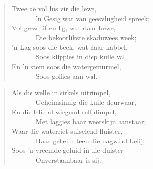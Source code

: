 \begin{verse}
Twee oë vol lus vir die lewe, \\ 
\ \ \ \ \ \ \ ’n Gesig wat van geesvlugheid spreek; \\ 
Vol geesdrif en lig, wat daar bewe, \\ 
\ \ \ \ \ \ \ Die bekoorlikste skaduwees week; \\ 
’n Lag soos die beek, wat daar kabbel, \\ 
\ \ \ \ \ \ \ Soos klippies in diep kuile val, \\ 
En ’n stem soos die watergemurmel, \\ 
\ \ \ \ \ \ \ Soos golfies aan wal.
\end{verse}

\begin{verse}
Als die welle in sirkels uitrimpel, \\ 
\ \ \ \ \ \ \ Geheimsinnig die kuile deurwaar, \\ 
En die lelie al wiegend self dimpel, \\ 
\ \ \ \ \ \ \ Met laggies haar weerskijn aanstaar; \\ 
Waar die waterriet suiselend fluister, \\ 
\ \ \ \ \ \ \ Haar geheim teen die nagwind belij; \\ 
Soos ’n vreemde geluid in die duister \\ 
\ \ \ \ \ \ \ Onverstaanbaar is sij.
\end{verse}